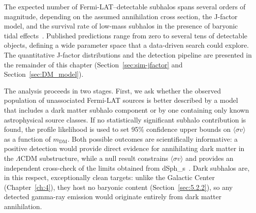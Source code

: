 The expected number of Fermi-LAT--detectable subhalos spans several orders of magnitude, depending on the assumed annihilation cross section, the J-factor model, and the survival rate of low-mass subhalos in the presence of baryonic tidal effects~\cite{2019JCAP...07..020C,2019JCAP...11..045C,2019Galax...7...90C}.
Published predictions range from zero to several tens of detectable objects, defining a wide parameter space that a data-driven search could explore.
The quantitative J-factor distributions and the detection pipeline are presented in the remainder of this chapter (Section~\ref{sec:sim-jfactor} and Section~\ref{sec:DM_model}).

The analysis proceeds in two stages.
First, we ask whether the observed population of unassociated Fermi-LAT sources is better described by a model that includes a dark matter subhalo component or by one containing only known astrophysical source classes.
If no statistically significant subhalo contribution is found, the profile likelihood is used to set 95\% confidence upper bounds on $\langle\sigma v\rangle$ as a function of $m_\mathrm{DM}$.
Both possible outcomes are scientifically informative: a positive detection would provide direct evidence for annihilating dark matter in the $\Lambda$CDM substructure, while a null result constrains $\langle\sigma v\rangle$ and provides an independent cross-check of the limits obtained from \glspl{dSph_}~\cite{2024PhRvD.109f3024M}.
Dark subhalos are, in this respect, exceptionally clean targets: unlike the Galactic Center (Chapter~\ref{ch:4}), they host no baryonic content (Section~\ref{sec:5.2.2}), so any detected gamma-ray emission would originate entirely from dark matter annihilation.

